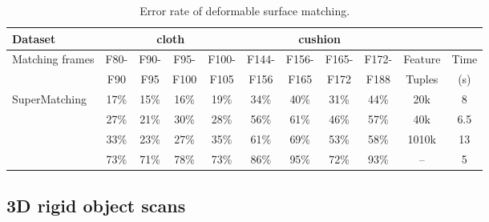 \begin{table}
\centering
\tabcolsep=1pt
\setlength{\aboverulesep}{0pt}
\setlength{\belowrulesep}{0pt}
\caption{Error rate of deformable surface matching.}
\hspace{-5ex}
\label{tab:errorrate1}
\small
\begin{tabular}{l|c c c c | c c c c | c c}
\toprule
{Dataset}  & \multicolumn{4}{|c|}{ {cloth}} & \multicolumn{4}{c|}{ {cushion}} & & \\
\hline
 {Matching frames} &  {F80-}	&  {F90-}	& {F95-}	& {F100-} & {F144-} & {F156-}	& {F165-}	& {F172-} & {Feature}	& {Time}  \\
 {}                &  {F90 }    &  {F95 }   & {F100}    & {F105}  & {F156}  & {F165}    & {F172}    & {F188}  & {Tuples}    &  {(s)} \\
\hline
 {SuperMatching}   &  {17\%}    &  {15\%}	& {16\%} 	& {19\%}  & {34\%}	& {40\%}	& {31\%}	& {44\%}  &  {20k}	    &  {8}  \\
 {\cite{Zass08}}   & {27\%}	    & {21\%}	& {30\%}	& {28\%}  & {56\%}  & {61\%}    & {46\%}	& {57\%}   & {40k}	    & {6.5}  \\
{\cite{Duchenne09}} & {33\%}    & {23\%}    & {27\%}	& {35\%}  & {61\%}	& {69\%}	& {53\%}	& {58\%}   & {1010k}    & {13}  \\
 {\cite{Cour06}}   & {73\%}     & {71\%}	&  {78\%}	& {73\%}  & {86\%}  & {95\%}	& {72\%}	& {93\%}   & {--}       & {5}  \\
\bottomrule
\end{tabular}%
\end{table}%
%

\subsection{3D rigid object scans}
\label{subsec:3DRigid}

